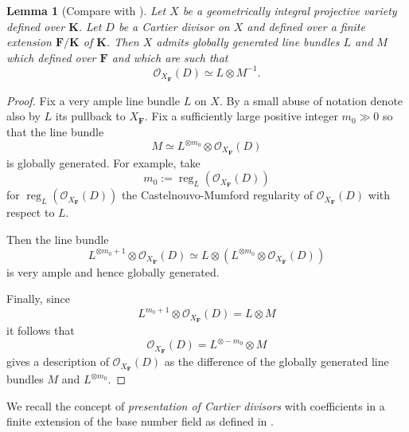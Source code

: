 \documentclass[10pt]{amsart}
\newcommand{\Osh}{{\mathcal O}}                        %
\newcommand{\KK}{\mathbf{K}}
\newcommand{\FF}{\mathbf{F}}
\newtheorem{lemma}[theorem]{Lemma}
\theoremstyle{definition}
\numberwithin{equation}{section}
\begin{document}
\begin{lemma}[Compare with {\cite[Exercise II.7.5]{Hart}}]\label{difference:ample:line:bundle:lemma}  Let $X$ be a geometrically integral projective variety defined over $\KK$.
Let $D$ be a Cartier divisor on $X$ and defined over a finite extension $\FF / \KK$ of $\KK$.  Then $X$ admits globally generated line bundles $L$ and $M$ which defined over $\FF$ and which are such that 
$$
\Osh_{X_{\FF}} (D) \simeq L \otimes M^{-1} \text{.}
$$
\end{lemma}
\begin{proof}
Fix a very ample line bundle $L$ on $X$.   By a small abuse of notation denote also by $L$ its pullback to $X_{\FF}$.   Fix a sufficiently large positive integer $m_0 \gg 0$ so that the line bundle 
$$M \simeq L^{\otimes m_0} \otimes \Osh_{X_{\FF}}(D)$$ 
is globally generated.  For example, take 
$$m_0 := \operatorname{reg}_{L}(\Osh_{X_{\FF}}(D))$$ 
for $\operatorname{reg}_{L}(\Osh_{X_{\FF}}(D))$ the Castelnouvo-Mumford regularity of $\Osh_{X_{\FF}}(D)$ with respect to $L$.

Then the line bundle
$$
L^{\otimes m_0 + 1 } \otimes \Osh_{X_{\FF}}(D) \simeq L \otimes \left( L^{\otimes m_0} \otimes \Osh_{X_{\FF}} (D) \right)
$$
is very ample and hence globally generated. 

Finally, since
$$
L^{m_0 + 1} \otimes \Osh_{X_{\FF}}(D) = L \otimes M
$$
it follows that 
$$
\Osh_{X_{\FF}}(D) = L^{\otimes - m_0} \otimes M
$$
gives a description of $\Osh_{X_{\FF}}(D)$ as the difference of the globally generated line bundles $M$ and $L^{\otimes m_0}$.
\end{proof}

We recall the concept of \emph{presentation of Cartier divisors} with coefficients in a finite extension of the base number field as defined in \cite[Section 2.2]{Grieve:qualitative:subspace}.
\end{document}

